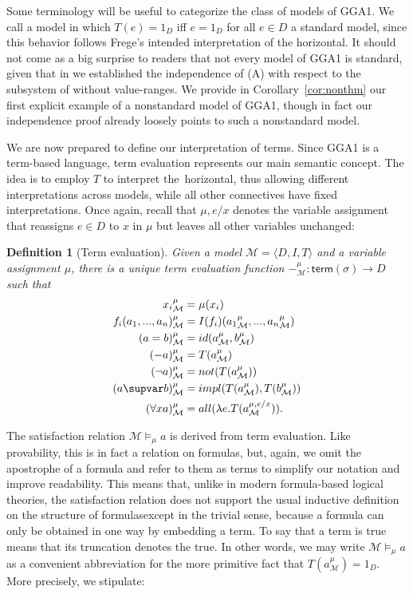 \documentclass{preprint}
\newtheorem{definition}[theorem]{Definition}
\newcommand{\M}{\mathcal{M}}
\newcommand{\term}{\mathsf{term}}
\newcommand{\GGA}{\textsf{GGA1}}
\renewcommand{\to}{\supvar}
\begin{document}
Some terminology will be useful to categorize the class of models of \GGA. 
We call a model in which $T(e)=1_D$ iff $e=1_D$ for all $e \in D$ a standard model, since this behavior follows Frege's intended interpretation of the horizontal. It should not come as a big surprise to readers that not every model of {\GGA} is standard, given that in  we established the independence of (A) with respect to the subsystem of {\gga} without value-ranges. We provide in Corollary~\ref{cor:nonthm} our first explicit example of a nonstandard model of \GGA, though in fact our independence proof already loosely points to such a nonstandard model.


We are now prepared to define our interpretation of terms. Since {\GGA} is a term-based language, term evaluation represents our main semantic concept. The idea is to employ $T$ to interpret the~horizontal, thus allowing different interpretations across models, while all other connectives have fixed interpretations. Once again, recall that $\mu, e/x$ denotes the variable assignment that reassigns $e \in D$ to $x$ in $\mu$ but leaves all other variables unchanged: 


\begin{definition}[Term evaluation] \label{terminterpretation}
	Given a model $\mathcal{M} = \langle D, I, T \rangle$ and a variable assignment $\mu$, there is a unique term evaluation function $-^{\mu}_\mathcal{M} : \term(\sigma) \rightarrow D$ such that
	\begin{align*}
		{x_i}^{\mu}_\mathcal{M} &= \mu(x_i) \\ 
		f_i(a_1, ..., a_n)^{\mu}_\mathcal{M} &= I(f_i)({a_1}^{\mu}_\mathcal{M}, ..., {a_n}^{\mu}_\mathcal{M}) \\
		(a = b)^{\mu}_\mathcal{M} &= id({a}^{\mu}_\mathcal{M},{b}^{\mu}_\mathcal{M}) \\
		(-a)^{\mu}_\mathcal{M} &= T({a}^{\mu}_\mathcal{M}) \\
		(\neg a)^{\mu}_\mathcal{M} &= not(T({a}^{\mu}_\mathcal{M})) \\
		(a \to b)^{\mu}_\mathcal{M} &= impl(T({a}^{\mu}_\mathcal{M}),T({b}^{\mu}_\mathcal{M})) \\
		(\forall x a)^{\mu}_\mathcal{M} &= all(\fun e T({a}^{\mu, e/x}_\mathcal{M})).
	\end{align*}
\end{definition}


The satisfaction relation $\M \vDash_{\mu} a$ is derived from term evaluation. 
Like provability, this is in fact a relation on formulas,
but, again, we omit the apostrophe of a formula and refer to them as terms to simplify our notation and improve readability. This means that, unlike in modern formula-based logical theories, the satisfaction relation does not support the usual inductive definition on the structure of formulas\textemdash  except in the trivial sense, because a formula can only be obtained in one way by embedding a term. 
To say that a term is true means that its truncation denotes the true. In other words, we may write $\M \vDash_{\mu} a$ as a convenient abbreviation for the more primitive fact that ${T(a^{\mu}_{\M})} = 1_D$. More precisely, we stipulate:
\end{document}
